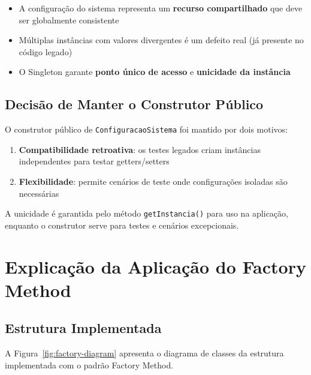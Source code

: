 \documentclass[12pt, a4paper]{article}
\begin{document}
\begin{itemize}
    \item A configuração do sistema representa um \textbf{recurso compartilhado} que deve ser globalmente consistente
    \item Múltiplas instâncias com valores divergentes é um defeito real (já presente no código legado)
    \item O Singleton garante \textbf{ponto único de acesso} e \textbf{unicidade da instância}
\end{itemize}

\subsection{Decisão de Manter o Construtor Público}

O construtor público de \texttt{ConfiguracaoSistema} foi mantido por dois motivos:

\begin{enumerate}
    \item \textbf{Compatibilidade retroativa}: os testes legados criam instâncias independentes para testar getters/setters
    \item \textbf{Flexibilidade}: permite cenários de teste onde configurações isoladas são necessárias
\end{enumerate}

A unicidade é garantida pelo método \texttt{getInstancia()} para uso na aplicação, enquanto o construtor serve para testes e cenários excepcionais.

\section{Explicação da Aplicação do Factory Method}

\subsection{Estrutura Implementada}

A Figura~\ref{fig:factory-diagram} apresenta o diagrama de classes da estrutura implementada com o padrão Factory Method.
\end{document}
